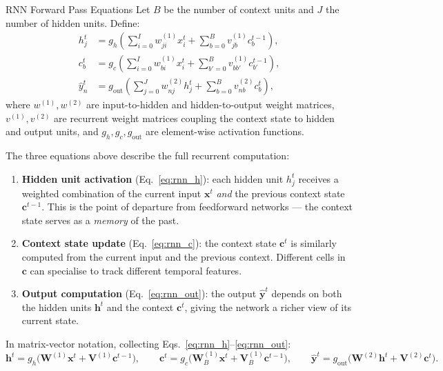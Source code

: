 \documentclass[11pt,a4paper]{article}
\begin{document}
\begin{defbox}{RNN Forward Pass Equations}
Let $B$ be the number of context units and $J$ the number of hidden units. Define:
\begin{align}
  h_j^t &= g_h\!\left(\sum_{i=0}^{I} w_{ji}^{(1)} x_i^t + \sum_{b=0}^{B} v_{jb}^{(1)} c_b^{t-1}\right), \label{eq:rnn_h}\\[4pt]
  c_b^t &= g_c\!\left(\sum_{i=0}^{I} w_{bi}^{(1)} x_i^t + \sum_{b'=0}^{B} v_{bb'}^{(1)} c_{b'}^{t-1}\right), \label{eq:rnn_c}\\[4pt]
  \hat{y}_n^t &= g_{\text{out}}\!\left(\sum_{j=0}^{J} w_{nj}^{(2)} h_j^t + \sum_{b=0}^{B} v_{nb}^{(2)} c_b^t\right), \label{eq:rnn_out}
\end{align}
where $w^{(1)}, w^{(2)}$ are input-to-hidden and hidden-to-output weight matrices, $v^{(1)}, v^{(2)}$ are recurrent weight matrices coupling the context state to hidden and output units, and $g_h, g_c, g_{\text{out}}$ are element-wise activation functions.
\end{defbox}

The three equations above describe the full recurrent computation:
\begin{enumerate}
  \item \textbf{Hidden unit activation} (Eq.~\ref{eq:rnn_h}): each hidden unit $h_j^t$ receives a weighted combination of the current input $\mathbf{x}^t$ \emph{and} the previous context state $\mathbf{c}^{t-1}$. This is the point of departure from feedforward networks — the context state serves as a \emph{memory} of the past.
  \item \textbf{Context state update} (Eq.~\ref{eq:rnn_c}): the context state $\mathbf{c}^t$ is similarly computed from the current input and the previous context. Different cells in $\mathbf{c}$ can specialise to track different temporal features.
  \item \textbf{Output computation} (Eq.~\ref{eq:rnn_out}): the output $\hat{\mathbf{y}}^t$ depends on both the hidden units $\mathbf{h}^t$ and the context $\mathbf{c}^t$, giving the network a richer view of its current state.
\end{enumerate}

In matrix-vector notation, collecting Eqs.~\ref{eq:rnn_h}--\ref{eq:rnn_out}:
\[
  \mathbf{h}^t = g_h\!\bigl(\mathbf{W}^{(1)}\mathbf{x}^t + \mathbf{V}^{(1)}\mathbf{c}^{t-1}\bigr),
  \qquad
  \mathbf{c}^t = g_c\!\bigl(\mathbf{W}_B^{(1)}\mathbf{x}^t + \mathbf{V}_B^{(1)}\mathbf{c}^{t-1}\bigr),
  \qquad
  \hat{\mathbf{y}}^t = g_{\text{out}}\!\bigl(\mathbf{W}^{(2)}\mathbf{h}^t + \mathbf{V}^{(2)}\mathbf{c}^t\bigr).
\]
\end{document}
